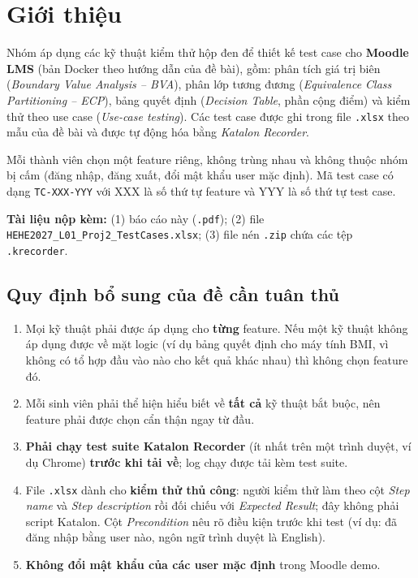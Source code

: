 \documentclass[12pt,a4paper]{article}
\begin{document}
\tableofcontents
\newpage

\section{Giới thiệu}
Nhóm áp dụng các kỹ thuật kiểm thử hộp đen để thiết kế test case cho \textbf{Moodle LMS} (bản Docker theo
hướng dẫn của đề bài), gồm: phân tích giá trị biên (\textit{Boundary Value Analysis -- BVA}),
phân lớp tương đương (\textit{Equivalence Class Partitioning -- ECP}), bảng quyết định
(\textit{Decision Table}, phần cộng điểm) và kiểm thử theo use case (\textit{Use-case testing}).
Các test case được ghi trong file \texttt{.xlsx} theo mẫu của đề bài và được tự động hóa bằng \textit{Katalon Recorder}.

Mỗi thành viên chọn một feature riêng, không trùng nhau và không thuộc nhóm bị cấm (đăng nhập, đăng xuất, đổi mật khẩu
user mặc định). Mã test case có dạng \texttt{TC-XXX-YYY} với XXX là số thứ tự feature và YYY là số thứ tự test case.

\textbf{Tài liệu nộp kèm:} (1) báo cáo này (\texttt{.pdf}); (2) file \texttt{HEHE2027\_L01\_Proj2\_TestCases.xlsx};
(3) file nén \texttt{.zip} chứa các tệp \texttt{.krecorder}.

\subsection*{Quy định bổ sung của đề cần tuân thủ}
\begin{enumerate}[noitemsep]
  \item Mọi kỹ thuật phải được áp dụng cho \textbf{từng} feature. Nếu một kỹ thuật không áp dụng được về mặt logic
        (ví dụ bảng quyết định cho máy tính BMI, vì không có tổ hợp đầu vào nào cho kết quả khác nhau) thì không chọn feature đó.
  \item Mỗi sinh viên phải thể hiện hiểu biết về \textbf{tất cả} kỹ thuật bắt buộc, nên feature phải được chọn cẩn thận
        ngay từ đầu.
  \item \textbf{Phải chạy test suite Katalon Recorder} (ít nhất trên một trình duyệt, ví dụ Chrome) \textbf{trước khi tải về};
        log chạy được tải kèm test suite.
  \item File \texttt{.xlsx} dành cho \textbf{kiểm thử thủ công}: người kiểm thử làm theo cột \textit{Step name} và
        \textit{Step description} rồi đối chiếu với \textit{Expected Result}; đây không phải script Katalon.
        Cột \textit{Precondition} nêu rõ điều kiện trước khi test (ví dụ: đã đăng nhập bằng user nào, ngôn ngữ trình duyệt là English).
  \item \textbf{Không đổi mật khẩu của các user mặc định} trong Moodle demo.
\end{enumerate}
\end{document}
